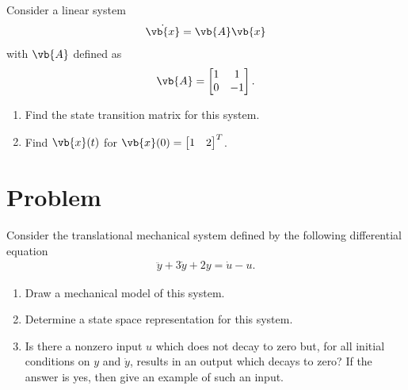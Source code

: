 \documentclass[titlepage, 11pt, reqno]{article}    %
\begin{document}
Consider a linear system 
\begin{align*}
    \dot{ \vb{x}} = \vb{A} \vb{x}
\end{align*}
with \( \vb{A} \) defined as 
\begin{align*}
    \vb{A} = \begin{bmatrix}
        1 & 1 \\
        0 & -1
    \end{bmatrix} .
\end{align*}

\begin{enumerate}
    \item Find the state transition matrix for this system.
    \item Find \( \vb{x}(t) \) for \( \vb{x}(0) = \begin{bmatrix} 1 & 2\end{bmatrix} ^T\).
\end{enumerate}
\clearpage
\newpage
\mbox{}
\clearpage
\section{Problem}

Consider the translational mechanical system defined by the following differential equation
\begin{align*}
    \ddot{y} + 3 \dot{y} + 2 y = \dot{u} - u.
\end{align*}

\begin{enumerate}
    \item Draw a mechanical model of this system.
    \item Determine a state space representation for this system.
    \item Is there a nonzero input \( u \) which does not decay to zero but, for all initial conditions on \( y \) and \( \dot y\), results in an output which decays to zero?
        If the answer is yes, then give an example of  such an input.
\end{enumerate}
\clearpage\newpage
\mbox{}
\clearpage

\end{document}
